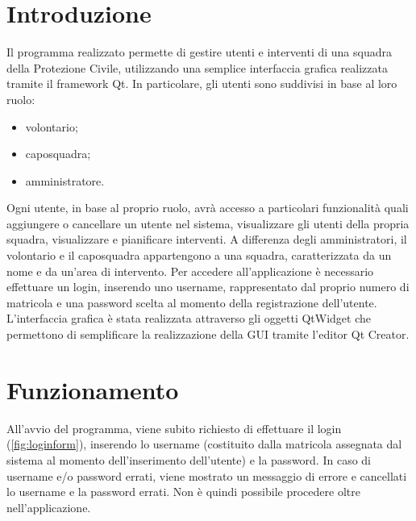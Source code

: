 \section{Introduzione}
Il programma realizzato permette di gestire utenti e interventi di una squadra della Protezione Civile, utilizzando una semplice interfaccia grafica realizzata tramite il framework Qt.
In particolare, gli utenti sono suddivisi in base al loro ruolo:
\begin{itemize}
	\item volontario;
	\item caposquadra;
	\item amministratore.
\end{itemize}
Ogni utente, in base al proprio ruolo, avrà accesso a particolari funzionalità quali aggiungere o cancellare un utente nel sistema, visualizzare gli utenti della propria squadra, visualizzare e pianificare interventi. A differenza degli amministratori, il volontario e il caposquadra appartengono a una squadra, caratterizzata da un nome e da un'area di intervento. 
Per accedere all'applicazione è necessario effettuare un login, inserendo uno username, rappresentato dal proprio numero di matricola e una password scelta al momento della registrazione dell'utente.
L'interfaccia grafica è stata realizzata attraverso gli oggetti QtWidget che permettono di semplificare la realizzazione della GUI tramite l'editor Qt Creator.

\section{Funzionamento}
All'avvio del programma, viene subito richiesto di effettuare il login (\Fig\ref{fig:loginform}), inserendo lo username (costituito dalla matricola assegnata dal sistema al momento dell'inserimento dell'utente) e la password. In caso di username e/o password errati, viene mostrato un messaggio di errore e cancellati lo username e la password errati. Non è quindi possibile procedere oltre nell'applicazione.


